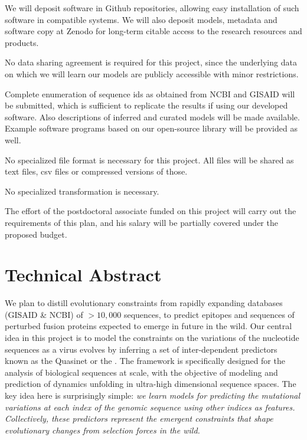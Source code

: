 \documentclass[onecolumn, compsoc,12pt]{IEEEtran}
\begin{document}
              We will deposit software in Github repositories, allowing easy installation of such software in compatible systems. We will also deposit models, metadata and software copy at Zenodo for long-term citable access to the research resources and products.


              No data sharing agreement is required for this project, since the underlying data on which we will learn our models are publicly accessible with minor restrictions.


              Complete enumeration of sequence ids as obtained from NCBI and GISAID will be submitted, which is sufficient to replicate the results if using our developed software. Also descriptions of inferred and curated models will be made available. Example software programs based on our open-source library will be provided as well.


              No specialized file format is necessary for this project. All files will be shared as text files, csv files or compressed versions of those.


              No specialized transformation is necessary.


              The effort of the postdoctoral associate funded on this project will carry out the requirements of this plan, and his salary will be partially covered under the proposed budget.



\clearpage
{}

\section*{Technical Abstract}

We plan to distill  evolutionary constraints from  rapidly expanding  databases (GISAID \& NCBI) of $> 10,000$  \hcov sequences, to predict  epitopes and sequences of perturbed fusion proteins expected to emerge in future in the wild. Our central idea in this project  is to model the constraints on the variations of the nucleotide sequences as a virus evolves by inferring a set of inter-dependent predictors known as the  Quasinet or the \qnet. The \qnet framework  is  specifically designed for the analysis of biological sequences at scale, with the  objective of modeling and prediction of dynamics unfolding in ultra-high dimensional sequence spaces. The key idea here is surprisingly simple: \textit{we learn models for predicting the mutational variations at each index of the genomic sequence using other indices  as features. Collectively, these predictors represent the emergent constraints that shape evolutionary changes from selection forces in the wild.}
\end{document}
